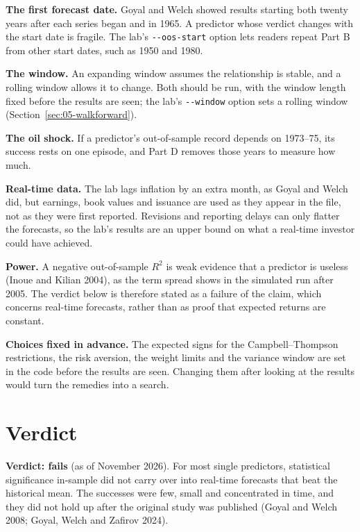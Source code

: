 \textbf{The first forecast date.} Goyal and Welch showed results starting both twenty years after each series began and in 1965. A predictor whose verdict changes with the start date is fragile. The lab's \texttt{-{}-oos-start} option lets readers repeat Part B from other start dates, such as 1950 and 1980.

\textbf{The window.} An expanding window assumes the relationship is stable, and a rolling window allows it to change. Both should be run, with the window length fixed before the results are seen; the lab's \texttt{-{}-window} option sets a rolling window (Section~\ref{sec:05-walkforward}).

\textbf{The oil shock.} If a predictor's out-of-sample record depends on 1973--75, its success rests on one episode, and Part D removes those years to measure how much.

\textbf{Real-time data.} The lab lags inflation by an extra month, as Goyal and Welch did, but earnings, book values and issuance are used as they appear in the file, not as they were first reported. Revisions and reporting delays can only flatter the forecasts, so the lab's results are an upper bound on what a real-time investor could have achieved.

\textbf{Power.} A negative out-of-sample $R^2$ is weak evidence that a predictor is useless (Inoue and Kilian 2004), as the term spread shows in the simulated run after 2005. The verdict below is therefore stated as a failure of the claim, which concerns real-time forecasts, rather than as proof that expected returns are constant.

\textbf{Choices fixed in advance.} The expected signs for the Campbell--Thompson restrictions, the risk aversion, the weight limits and the variance window are set in the code before the results are seen. Changing them after looking at the results would turn the remedies into a search.

\section{Verdict}
\label{sec:05-verdict}

\begin{callout}
\textbf{Verdict: fails} (as of November 2026). For most single predictors, statistical significance in-sample did not carry over into real-time forecasts that beat the historical mean. The successes were few, small and concentrated in time, and they did not hold up after the original study was published (Goyal and Welch 2008; Goyal, Welch and Zafirov 2024).
\end{callout}

